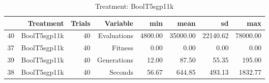 \begin{table}[ht]
\centering
\begin{tabular}{rrrrrrrr}
  \hline
 & Treatment & Trials & Variable & min & mean & sd & max \\ 
  \hline
40 & BoolT5sgp11k &  40 & Evaluations & 4800.00 & 35000.00 & 22140.62 & 78000.00 \\ 
  37 & BoolT5sgp11k &  40 & Fitness & 0.00 & 0.00 & 0.00 & 0.00 \\ 
  39 & BoolT5sgp11k &  40 & Generations & 12.00 & 87.50 & 55.35 & 195.00 \\ 
  38 & BoolT5sgp11k &  40 & Seconds & 56.67 & 644.85 & 493.13 & 1832.77 \\ 
   \hline
\end{tabular}
\caption{Treatment: BoolT5sgp11k} 
\end{table}
